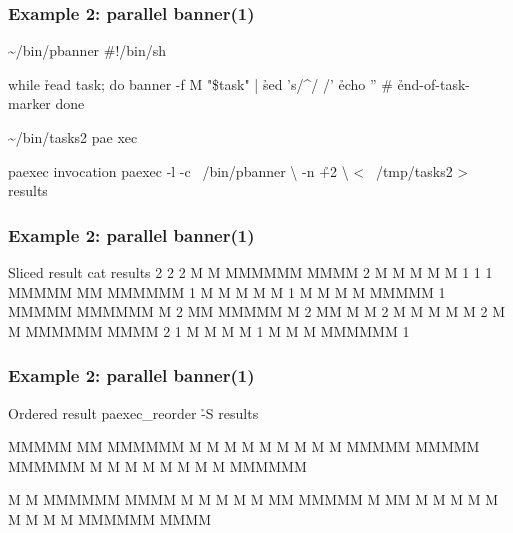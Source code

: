 \documentclass[hyperref={colorlinks=true}]{beamer}
\begin{document}
\begin{frame}[fragile]
  \frametitle{Example 2: parallel banner(1)}

  \begin{block}{}
      \begin{CodeLarge}{\~{}/bin/pbanner}
#!/bin/sh

while \h{read task}; do
   banner -f M "\$task" | \h{sed 's/^/ /'}
   \h{echo} '' # \h{end-of-task-marker}
done
      \end{CodeLarge}
      \begin{CodeLarge}{\~{}/bin/tasks2}
pae
xec
      \end{CodeLarge}

      \begin{CodeLarge}{paexec invocation}
\prompt{\$} paexec -l -c ~/bin/pbanner \textbackslash
   -n \h{+2} \textbackslash
   < ~/tmp/tasks2 > results
\prompt{\$}
      \end{CodeLarge}
  \end{block}
\end{frame}

\linespread{0.5}
\begin{frame}[fragile]
  \frametitle{Example 2: parallel banner(1)}

  \begin{block}{}
      \begin{CodeSmall}{Sliced result}
\prompt{\$} cat results
2  
2  
2   M    M  MMMMMM   MMMM
2    M  M   M       M    M
1  
1  
1   MMMMM     MM    MMMMMM
1   M    M   M  M   M
1   M    M  M    M  MMMMM
1   MMMMM   MMMMMM  M
2     MM    MMMMM   M
2     MM    M       M
2    M  M   M       M    M
2   M    M  MMMMMM   MMMM
2  
1   M       M    M  M
1   M       M    M  MMMMMM
1  
\prompt{\$}
      \end{CodeSmall}
  \end{block}
\end{frame}
\linespread{1}

\linespread{0.5}
\begin{frame}[fragile]
  \frametitle{Example 2: parallel banner(1)}

  \begin{block}{}
      \begin{CodeSmall}{Ordered result}
\prompt{\$} paexec_reorder \h{-S} results


 MMMMM     MM    MMMMMM
 M    M   M  M   M
 M    M  M    M  MMMMM
 MMMMM   MMMMMM  M
 M       M    M  M
 M       M    M  MMMMMM



 M    M  MMMMMM   MMMM
  M  M   M       M    M
   MM    MMMMM   M
   MM    M       M
  M  M   M       M    M
 M    M  MMMMMM   MMMM


\prompt{\$}
      \end{CodeSmall}
  \end{block}
\end{frame}
\linespread{1}
\end{document}

